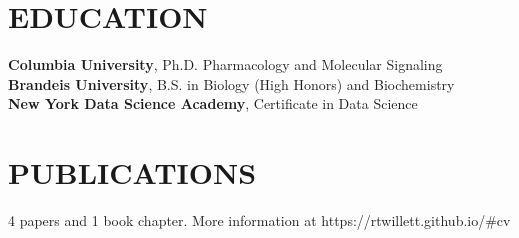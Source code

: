 \documentclass[11pt]{article}
\begin{document}
\section*{EDUCATION}
\vspace{-3truemm}
{\bfseries Columbia University}, Ph.D. Pharmacology and Molecular Signaling \\
{\bfseries Brandeis University}, B.S. in Biology (High Honors) and Biochemistry \\
{\bfseries New York Data Science Academy}, Certificate in Data Science

\section*{PUBLICATIONS}
\vspace{-3truemm}
4 papers and 1 book chapter. More information at https://rtwillett.github.io/\#cv
\end{document}
